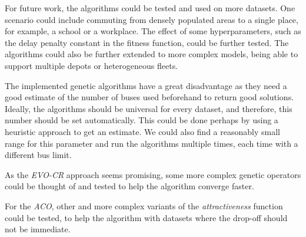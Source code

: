 For future work, the algorithms could be tested and used on more datasets. One scenario could include commuting from densely populated areas to a single place, for example, a school or a workplace. The effect of some hyperparameters, such as the delay penalty constant in the fitness function, could be further tested. The algorithms could also be further extended to more complex models, being able to support multiple depots or heterogeneous fleets.

The implemented genetic algorithms have a great disadvantage as they need a good estimate of the number of buses used beforehand to return good solutions. Ideally, the algorithms should be universal for every dataset, and therefore, this number should be set automatically. This could be done perhaps by using a heuristic approach to get an estimate. We could also find a reasonably small range for this parameter and run the algorithms multiple times, each time with a different bus limit.

As the \textit{EVO-CR} approach seems promising, some more complex genetic operators could be thought of and tested to help the algorithm converge faster.

For the \textit{ACO}, other and more complex variants of the \textit{attractiveness} function could be tested, to help the algorithm with datasets where the drop-off should not be immediate.